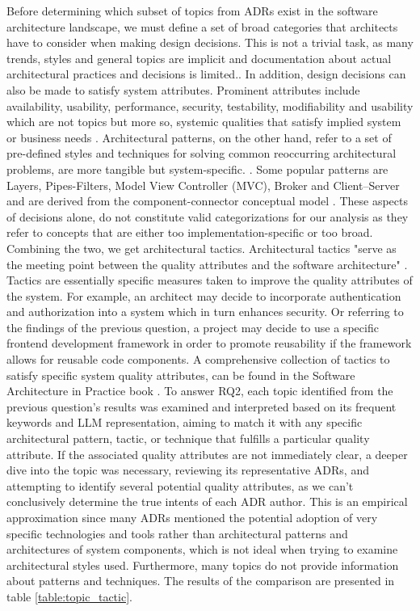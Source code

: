        Before determining which subset of topics from ADRs exist in the software architecture landscape, we must define a set of broad categories that architects have to consider when making design decisions. This is not a trivial task, as many trends, styles and general topics are implicit and documentation about actual architectural practices and decisions is limited.\cite{arch_patterns_in_practice_TOPICS}. In addition, design decisions can also be made to satisfy system attributes. Prominent attributes include availability, usability, performance, security, testability, modifiability and usability which are not topics but more so, systemic qualities that satisfy implied system or business needs \cite{patters+quality_requirements+tactics}. Architectural patterns, on the other hand, refer to a set of pre-defined styles and techniques for solving common reoccurring architectural problems, are more tangible but system-specific. \cite{Patterns+ArchDecisions}. Some popular patterns are Layers, Pipes-Filters, Model View Controller (MVC), Broker and Client–Server and are derived from the component-connector conceptual model \cite{survey_arch_patterns}. These aspects of decisions alone, do not constitute valid categorizations for our analysis as they refer to concepts that are either too implementation-specific or too broad. Combining the two, we get architectural tactics. Architectural tactics "serve as the
        meeting point between the quality attributes and the software architecture" \cite{patters+quality_requirements+tactics}. Tactics are essentially specific measures taken to improve the quality attributes of the system. For example, an architect may decide to incorporate authentication and authorization into a system which in turn enhances security. Or referring to the findings of the previous question, a project may decide to use a specific frontend development framework in order to promote reusability if the framework allows for reusable code components. A comprehensive collection of tactics to satisfy specific system quality attributes, can be found in the Software Architecture in Practice book \cite{software_arch_in_practice_book}. 
        To answer RQ2, each topic identified from the previous question's results was examined and interpreted based on its frequent keywords and LLM representation, aiming to match it with any specific architectural pattern, tactic, or technique that fulfills a particular quality attribute. If the associated quality attributes are not immediately clear, a deeper dive into the topic was necessary, reviewing its representative ADRs, and attempting to identify several potential quality attributes, as we can't conclusively determine the true intents of each ADR author. This is an empirical approximation since many ADRs mentioned the potential adoption of very specific technologies and tools rather than architectural patterns and architectures of system components, which is not ideal when trying to examine architectural styles used. Furthermore, many topics do not provide information about patterns and techniques. The results of the comparison are presented in table \ref{table:topic_tactic}.

